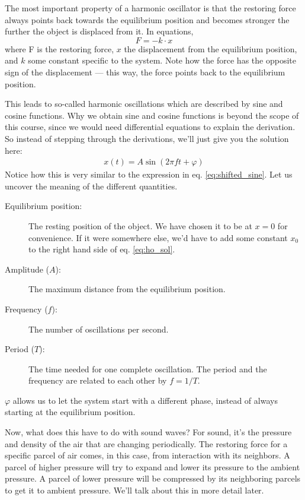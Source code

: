 The most important property of a harmonic oscillator is that the restoring force always points back towards the equilibrium position and becomes stronger the further the object is displaced from it. In equations,
\begin{equation}
    F = - k \cdot x
\end{equation}
where F is the restoring force, $x$ the displacement from the equilibrium position, and $k$ some constant specific to the system. Note how the force has the opposite sign of the displacement --- this way, the force points back to the equilibrium position.

This leads to so-called harmonic oscillations which are described by sine and cosine functions. Why we obtain sine and cosine functions is beyond the scope of this course, since we would need differential equations to explain the derivation. So instead of stepping through the derivations, we'll just give you the solution here:
\begin{align}\label{eq:ho_sol}
   x(t)=A\sin(2\pi ft + \varphi)
\end{align}
Notice how this is very similar to the expression in eq. \ref{eq:shifted_sine}. Let us uncover the meaning of the different quantities.

\begin{description}
\item[Equilibrium position:] The resting position of the object. We have chosen it to be at $x=0$ for convenience. If it were somewhere else, we'd have to add some constant $x_0$ to the right hand side of eq. \ref{eq:ho_sol}.
\item[Amplitude ($A$):] The maximum distance from the equilibrium position.
\item[Frequency ($f$):] The number of oscillations per second.
\item[Period ($T$):] The time needed for one complete oscillation. The period and the frequency are related to each other by $f = 1/T$.
\end{description}
$\varphi$ allows us to let the system start with a different phase, instead of always starting at the equilibrium position.

Now, what does this have to do with sound waves? For sound, it's the pressure and density of the air that are changing periodically. The restoring force for a specific parcel of air comes, in this case, from interaction with its neighbors. A parcel of higher pressure will try to expand and lower its pressure to the ambient pressure. A parcel of lower pressure will be compressed by its neighboring parcels to get it to ambient pressure. We'll talk about this in more detail later.

